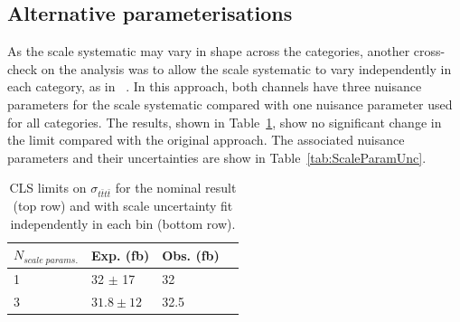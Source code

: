 


\subsection{Alternative parameterisations}

As the scale systematic may vary in shape across the \njets categories, another cross-check on the analysis was to allow the scale systematic to vary independently in each \njets category, as in ~\cite{ref:heavyquarksSplit, ref:B2G-12-004}. In this approach, both channels have three nuisance parameters for the scale systematic compared with one nuisance parameter used for all \njets categories. The results, shown in Table~\ref{tab:limsScale}, show no significant change in the limit compared with the original approach. The associated nuisance parameters and their uncertainties are show in Table~\ref{tab:ScaleParamUnc}.

\begin{table}[ht!]
\centering
\begin{tabular}{| l | l | l | p{1cm} |}
 \hline 
$N_{scale \; params.}$ & Exp. (fb) &Obs. (fb) \\
\hline
1&{\color{blue} 32  $\pm$ 17}  & {\color{blue}32}\\
 \hline
3  &  $31.8\pm{12}$ & 32.5 \\
\hline
\end{tabular}
\caption{CLS limits on $\sigma_{t\bar{t}t\bar{t}}$ for the nominal result (top row) and with scale uncertainty fit independently in each \njets bin (bottom row). }
\label{tab:limsScale}
\end{table}

